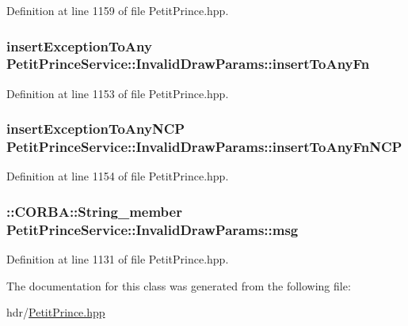 Definition at line 1159 of file Petit\+Prince.\+hpp.

\subsubsection[{\texorpdfstring{insert\+To\+Any\+Fn}{insertToAnyFn}}]{ insert\+Exception\+To\+Any Petit\+Prince\+Service\+::\+Invalid\+Draw\+Params\+::insert\+To\+Any\+Fn\hspace{0.3cm}{\ttfamily [static]}}\hypertarget{class_petit_prince_service_1_1_invalid_draw_params_a3c0d3050311043226e9d0a0882d4c25f}{}\label{class_petit_prince_service_1_1_invalid_draw_params_a3c0d3050311043226e9d0a0882d4c25f}


Definition at line 1153 of file Petit\+Prince.\+hpp.

\subsubsection[{\texorpdfstring{insert\+To\+Any\+Fn\+N\+CP}{insertToAnyFnNCP}}]{ insert\+Exception\+To\+Any\+N\+CP Petit\+Prince\+Service\+::\+Invalid\+Draw\+Params\+::insert\+To\+Any\+Fn\+N\+CP\hspace{0.3cm}{\ttfamily [static]}}\hypertarget{class_petit_prince_service_1_1_invalid_draw_params_afce432eda8989d47faee11da1a73348e}{}\label{class_petit_prince_service_1_1_invalid_draw_params_afce432eda8989d47faee11da1a73348e}


Definition at line 1154 of file Petit\+Prince.\+hpp.

\subsubsection[{\texorpdfstring{msg}{msg}}]{\setlength{\rightskip}{0pt plus 5cm}\+::C\+O\+R\+B\+A\+::\+String\+\_\+member Petit\+Prince\+Service\+::\+Invalid\+Draw\+Params\+::msg}\hypertarget{class_petit_prince_service_1_1_invalid_draw_params_ad20b320baca257a2276e76a6efc94a91}{}\label{class_petit_prince_service_1_1_invalid_draw_params_ad20b320baca257a2276e76a6efc94a91}


Definition at line 1131 of file Petit\+Prince.\+hpp.



The documentation for this class was generated from the following file\+:\begin{DoxyCompactItemize}
\item 
hdr/\hyperlink{_petit_prince_8hpp}{Petit\+Prince.\+hpp}\end{DoxyCompactItemize}
